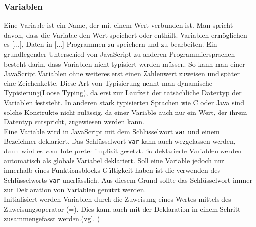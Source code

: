 \subsubsection{Variablen} \glqq Eine Variable ist ein Name, der mit einem Wert verbunden ist. Man spricht davon, dass die Variable den Wert speichert oder enthält. Variablen ermöglichen es [...], Daten in [...] Programmen zu speichern und zu bearbeiten.\grqq{}\cite[S.51]{FlanJava2007} Ein grundlegender Unterschied von JavaScript zu anderen Programmiersprachen besteht darin, dass Variablen nicht typisiert werden müssen. So kann man einer JavaScript Variablen ohne weiteres erst einen Zahlenwert zuweisen und später eine Zeichenkette. Diese Art von Typisierung nennt man dynamische Typisierung(Loose Typing), da erst zur Laufzeit der tatsächliche Datentyp der Variablen feststeht. In anderen stark typisierten Sprachen wie C oder Java sind solche Konstrukte nicht zulässig, da einer Variable auch nur ein Wert, der ihrem Datentyp entspricht, zugewiesen werden kann.\\Eine Variable wird in JavaScript mit dem Schlüsselwort \texttt{var} und einem Bezeichner deklariert. Das Schlüsselwort \texttt{var} kann auch weggelassen werden, dann wird es vom Interpreter implizit gesetzt. So deklarierte Variablen werden automatisch als globale Variabel deklariert. Soll eine Variable jedoch nur innerhalb eines Funktionsblocks Gültigkeit haben ist die verwenden des Schlüsselworts \texttt{var} unerlässlich. Aus diesem Grund sollte das Schlüsselwort immer zur Deklaration von Variablen genutzt werden.\\Initialisiert werden Variablen durch die Zuweisung eines Wertes mittels des Zuweisungsoperator (=). Dies kann auch mit der Deklaration in einem Schritt zusammengefasst werden.(vgl. \cite[S.52ff]{FlanJava2007})

